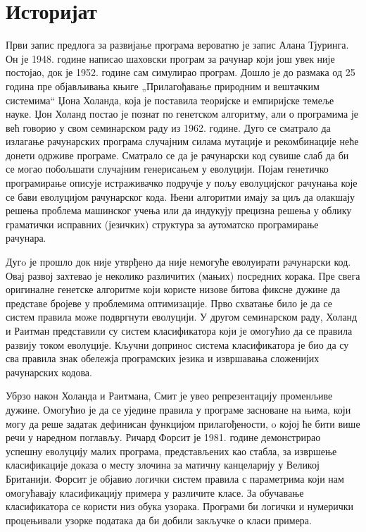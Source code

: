 \documentclass[a4paper]{article}
\begin{document}
\section{Историјат}
Први запис предлога за развијање програма вероватно је запис Алана Тјуринга. Он је 1948. године написао шаховски програм за рачунар који још увек није постојао, док је 1952. године сам симулирао програм. Дошло је до размака од 25 година пре објављивања књиге „Прилагођавање природним и вештачким системима“ Џона Холанда, која је поставила теоријске и емпиријске темеље науке.
Џон Холанд постао је познат по генетском алгоритму, али о програмима је већ говорио у свом семинарском раду из 1962. године. Дуго се сматрало да излагање рачунарских програма
случајним силама мутације и рекомбинације неће донети одрживе програме. Сматрало се да је рачунарски код сувише слаб да би се могао побољшати случајним генерисањем у еволуцији.
Појам генетичко програмирање описује истраживачко подручје у пољу еволуцијског рачунања које се бави еволуцијом рачунарског кода. Њени алгоритми имају за циљ да олакшају решења проблема машинског учења или да индукују прецизна решења у облику граматички исправних (језичких) структура за аутоматско програмирање рачунара.



Дугo је прошло док није утврђено  да није немогуће еволуирати рачунарски код. Овај развој захтевао је неколико различитих (мањих) посредних корака. Пре свега оригиналне генетске алгоритме који користе низове битова фиксне дужине да представе бројеве у проблемима оптимизације. Прво схватање било је да се систем правила може подвргнути еволуцији. У другом семинарском раду, Холанд и Раитман представили су систем класификатора који је омогућио да се правила развију током еволуције. Кључни допринос система класификатора је био да су сва правила знак обележја програмских језика и извршавања сложенијих рачунарских кодова.


Убрзо након Холанда и Раитмана, Смит је увео репрезентацију променљиве дужине.  Омогућио је да се уједине правила у програме засноване на њима, који могу да реше задатак дефинисан функцијом прилагођености, o којој ће бити више речи у наредном поглављу. Ричард Форсит је 1981. године демонстрирао успешну еволуцију малих програма, представљених као стабла, за извршење класификације доказа о месту злочина за матичну канцеларију у Великој Британији. Форсит је објавио логички систем правила с параметрима који нам омогућавају класификацију примера у различите класе. За обучавање класификатора се користи низ обука узорака. Програми би логички и нумерички процењивали узорке података да би добили закључке о класи примера.
\end{document}
